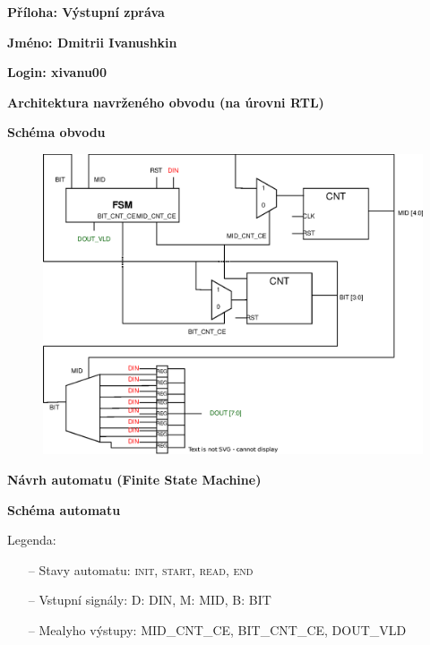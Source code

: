 \documentclass[11pt,a4paper]{article}
\begin{document}
\selectfont
\huge \textbf{\color{violet}Příloha: Výstupní zpráva}

\bigskip

\large \textbf{Jméno: Dmitrii Ivanushkin}

\large \textbf{Login: xivanu00}

\bigskip

\Large \textbf{\color{violet}Architektura navrženého obvodu (na úrovni RTL)}

\bigskip

\large \textbf{\color{violet}Schéma obvodu}

\bigskip

\begin{figure}[h]
    \centering
    \includegraphics[scale=1]{pic1.eps}
\end{figure}

\newpage
\Large \textbf{\color{violet}Návrh automatu (Finite State Machine)}

\bigskip

\large \textbf{\color{violet}Schéma automatu}

\bigskip
Legenda:
\begin{itemize}
\setlength\itemsep{-1mm}
    \item[--] \quad Stavy automatu: \textsc{init, start, read, end}
    \item[--] \quad Vstupní signály: \textsc{D: DIN, M: MID, B: BIT}
    \item[--] \quad Mealyho výstupy: \textsc{MID\_CNT\_CE, BIT\_CNT\_CE, DOUT\_VLD}
\end{itemize}
\end{document}
